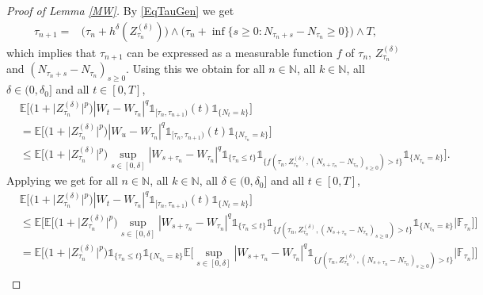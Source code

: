 \documentclass[11pt,a4paper]{article}
\numberwithin{equation}{section}
\theoremstyle{definition}
\newcommand{\E}{{\mathbb{E}}}
\newcommand{\N}{{\mathbb{N}}}
\newcommand{\F}{\mathbb{F}}
\begin{document}
\begin{proof}[Proof of Lemma \ref{MW}]
By \eqref{EqTauGen} we get
\begin{equation}
    \begin{aligned}\label{MW2}
        \tau_{n+1} = & \big(\tau_n+ h^\delta(Z^{(\delta)}_{\tau_n})\big)\wedge \big(\tau_n + \inf\{s\geq 0 : N_{\tau_n+s}-N_{\tau_n}\geq 0\} \big) \wedge T,
    \end{aligned}
\end{equation}
which implies that $\tau_{n+1}$ can be expressed as a measurable function $f$ of $\tau_n$, $Z^{(\delta)}_{\tau_n}$ and $(N_{\tau_n+s} -N_{\tau_n})_{s\geq 0}$. Using this we obtain for all $n\in\N$, all $k\in\N$, all $\delta\in(0,\delta_0]$ and all $t\in[0,T]$,
\begin{equation}
    \begin{aligned}\label{MW3}
    &\E\big[\big(1+ \big|Z^{(\delta)}_{\tau_n}\big|^p\big)   |W_t-W_{\tau_n}|^q \mathds{1}_{[\tau_n,\tau_{n+1})}(t)  \mathds{1}_{\{N_t = k\}} \big]\\
    &= \E\big[\big(1+ \big|Z^{(\delta)}_{\tau_n}\big|^p\big)   |W_u-W_{\tau_n}|^q \mathds{1}_{[\tau_n,\tau_{n+1})}(t)  \mathds{1}_{\{N_{\tau_n} = k\}} \big]\\
    &\leq \E\Big[\big(1+ \big|Z^{(\delta)}_{\tau_n}\big|^p\big)  \sup_{s\in[0,\delta]} |W_{s+\tau_n}-W_{\tau_n}|^q \mathds{1}_{\{\tau_n \leq t\}} \mathds{1}_{\{f(\tau_n,Z^{(\delta)}_{\tau_n}, (N_{s+\tau_n}-N_{\tau_n})_{s\geq 0})> t\}} \mathds{1}_{\{N_{\tau_n} = k\}} \Big].
    \end{aligned}
\end{equation}
Applying \cite[p.~33]{Grikhman2004} we get for all $n\in\N$, all $k\in\N$, all $\delta\in(0,\delta_0]$ and all $t\in[0,T]$,
\begin{equation}
    \begin{aligned}\label{MW4}
    &\E\big[\big(1+ \big|Z^{(\delta)}_{\tau_n}\big|^p\big)   |W_t-W_{\tau_n}|^q \mathds{1}_{[\tau_n,\tau_{n+1})}(t)  \mathds{1}_{\{N_t = k\}} \big]\\
    &\leq \E\Big[\E\Big[\big(1+ \big|Z^{(\delta)}_{\tau_n}\big|^p\big)  \sup_{s\in[0,\delta]} |W_{s+\tau_n}-W_{\tau_n}|^q \mathds{1}_{\{\tau_n \leq t\}} \mathds{1}_{\{f(\tau_n, Z^{(\delta)}_{\tau_n}, (N_{s+\tau_n}-N_{\tau_n})_{s\geq 0})> t\}} \mathds{1}_{\{N_{\tau_n} = k\}} \Big| \F_{\tau_n} \Big] \Big] \\
    &= \E\Big[\big(1+ \big|Z^{(\delta)}_{\tau_n}\big|^p\big) \mathds{1}_{\{\tau_n \leq t\}} \mathds{1}_{\{N_{\tau_n} = k\}} \E\Big[ \sup_{s\in[0,\delta]} |W_{s+\tau_n}-W_{\tau_n}|^q  \mathds{1}_{\{f(\tau_n, Z^{(\delta)}_{\tau_n}, (N_{s+\tau_n}-N_{\tau_n})_{s\geq 0})> t\}}  \Big| \F_{\tau_n} \Big] \Big] \\

\end{aligned}
\end{equation}
\end{proof}
\end{document}
